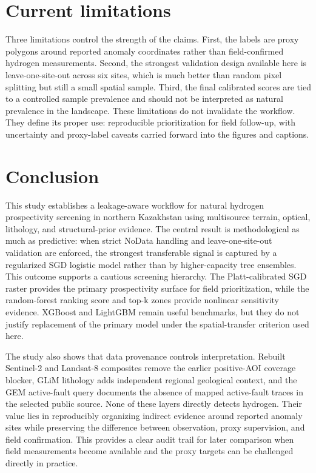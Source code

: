 \documentclass[numrefs]{interact}
\theoremstyle{plain}%
\theoremstyle{definition}
\theoremstyle{remark}
\begin{document}
\section{Current limitations}
Three limitations control the strength of the claims. First, the labels are proxy polygons around reported anomaly coordinates rather than field-confirmed hydrogen measurements. Second, the strongest validation design available here is leave-one-site-out across six sites, which is much better than random pixel splitting but still a small spatial sample. Third, the final calibrated scores are tied to a controlled sample prevalence and should not be interpreted as natural prevalence in the landscape. These limitations do not invalidate the workflow. They define its proper use: reproducible prioritization for field follow-up, with uncertainty and proxy-label caveats carried forward into the figures and captions.

\section{Conclusion}
This study establishes a leakage-aware workflow for natural hydrogen prospectivity screening in northern Kazakhstan using multisource terrain, optical, lithology, and structural-prior evidence. The central result is methodological as much as predictive: when strict NoData handling and leave-one-site-out validation are enforced, the strongest transferable signal is captured by a regularized SGD logistic model rather than by higher-capacity tree ensembles. This outcome supports a cautious screening hierarchy. The Platt-calibrated SGD raster provides the primary prospectivity surface for field prioritization, while the random-forest ranking score and top-k zones provide nonlinear sensitivity evidence. XGBoost and LightGBM remain useful benchmarks, but they do not justify replacement of the primary model under the spatial-transfer criterion used here.

The study also shows that data provenance controls interpretation. Rebuilt Sentinel-2 and Landsat-8 composites remove the earlier positive-AOI coverage blocker, GLiM lithology adds independent regional geological context, and the GEM active-fault query documents the absence of mapped active-fault traces in the selected public source. None of these layers directly detects hydrogen. Their value lies in reproducibly organizing indirect evidence around reported anomaly sites while preserving the difference between observation, proxy supervision, and field confirmation. This provides a clear audit trail for later comparison when field measurements become available and the proxy targets can be challenged directly in practice.
\end{document}
